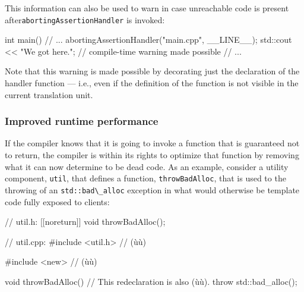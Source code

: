 \noindent This information can also be used to warn in case unreachable code is
present after\linebreak[4] \lstinline!abortingAssertionHandler! is invoked:

\begin{emcppslisting}[emcppsbatch=e3]
int main()
{
    // ...
    abortingAssertionHandler("main.cpp", __LINE__);
    std::cout << "We got here.\n";  // compile-time warning made possible
    // ...
}
\end{emcppslisting}


\noindent Note that this warning is made possible by decorating just the
declaration of the handler function --- i.e., even if the definition of
the function is not visible in the current translation unit.

\subsubsection[Improved runtime performance]{Improved runtime performance}\label{improved-runtime-performance}

If the compiler knows that it is going to invoke a function
that is guaranteed not to return, the compiler is within its rights to optimize
that function by removing what it can now determine to be dead code. As
an example, consider a utility component, \lstinline!util!, that defines a
function, \lstinline!throwBadAlloc!, that is used to  the
throwing of an \lstinline!std::bad\_alloc! exception in what would
otherwise be template code fully exposed to clients:

%
%
\begin{emcppslisting}[emcppsbatch=e4]
// util.h:
[[noreturn]] void throwBadAlloc();

// util.cpp:
#include <util.h>  // (ù{}ù)

#include <new>    // (ù{}ù)

void throwBadAlloc()  // This redeclaration is also (ù{\codeincomments{[[noreturn]]}}ù).
{
    throw std::bad_alloc();
}
\end{emcppslisting}


